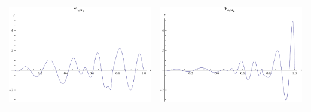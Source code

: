 \documentclass{article}
\begin{document}
\begin{landscape}
\begin{tabular}{cc}
\includegraphics[width=10.cm]{nonic_wavelet_dright_1.pdf}& \includegraphics[width=10.cm]{nonic_wavelet_dright_2.pdf} \\
\end{tabular} 
 \end{landscape}
\end{document}
